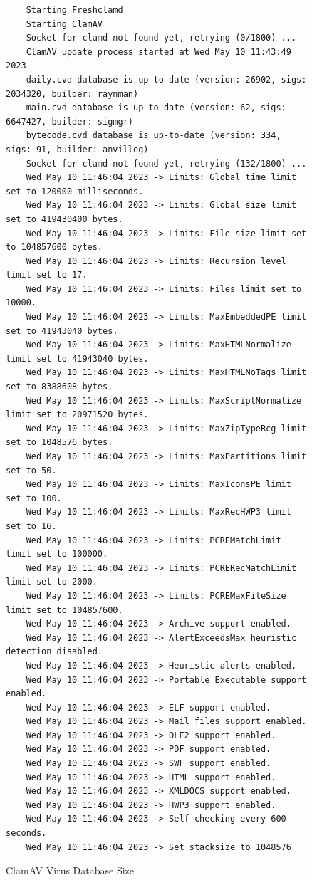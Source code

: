 \documentclass[12pt, conference, final, a4paper, onecolumn, compsoc]{IEEEtran}
\begin{document}
\begin{figure}[H]
  \begin{lstlisting}
    Starting Freshclamd
    Starting ClamAV
    Socket for clamd not found yet, retrying (0/1800) ...
    ClamAV update process started at Wed May 10 11:43:49 2023
    daily.cvd database is up-to-date (version: 26902, sigs: 2034320, builder: raynman)
    main.cvd database is up-to-date (version: 62, sigs: 6647427, builder: sigmgr)
    bytecode.cvd database is up-to-date (version: 334, sigs: 91, builder: anvilleg)
    Socket for clamd not found yet, retrying (132/1800) ...
    Wed May 10 11:46:04 2023 -> Limits: Global time limit set to 120000 milliseconds.
    Wed May 10 11:46:04 2023 -> Limits: Global size limit set to 419430400 bytes.
    Wed May 10 11:46:04 2023 -> Limits: File size limit set to 104857600 bytes.
    Wed May 10 11:46:04 2023 -> Limits: Recursion level limit set to 17.
    Wed May 10 11:46:04 2023 -> Limits: Files limit set to 10000.
    Wed May 10 11:46:04 2023 -> Limits: MaxEmbeddedPE limit set to 41943040 bytes.
    Wed May 10 11:46:04 2023 -> Limits: MaxHTMLNormalize limit set to 41943040 bytes.
    Wed May 10 11:46:04 2023 -> Limits: MaxHTMLNoTags limit set to 8388608 bytes.
    Wed May 10 11:46:04 2023 -> Limits: MaxScriptNormalize limit set to 20971520 bytes.
    Wed May 10 11:46:04 2023 -> Limits: MaxZipTypeRcg limit set to 1048576 bytes.
    Wed May 10 11:46:04 2023 -> Limits: MaxPartitions limit set to 50.
    Wed May 10 11:46:04 2023 -> Limits: MaxIconsPE limit set to 100.
    Wed May 10 11:46:04 2023 -> Limits: MaxRecHWP3 limit set to 16.
    Wed May 10 11:46:04 2023 -> Limits: PCREMatchLimit limit set to 100000.
    Wed May 10 11:46:04 2023 -> Limits: PCRERecMatchLimit limit set to 2000.
    Wed May 10 11:46:04 2023 -> Limits: PCREMaxFileSize limit set to 104857600.
    Wed May 10 11:46:04 2023 -> Archive support enabled.
    Wed May 10 11:46:04 2023 -> AlertExceedsMax heuristic detection disabled.
    Wed May 10 11:46:04 2023 -> Heuristic alerts enabled.
    Wed May 10 11:46:04 2023 -> Portable Executable support enabled.
    Wed May 10 11:46:04 2023 -> ELF support enabled.
    Wed May 10 11:46:04 2023 -> Mail files support enabled.
    Wed May 10 11:46:04 2023 -> OLE2 support enabled.
    Wed May 10 11:46:04 2023 -> PDF support enabled.
    Wed May 10 11:46:04 2023 -> SWF support enabled.
    Wed May 10 11:46:04 2023 -> HTML support enabled.
    Wed May 10 11:46:04 2023 -> XMLDOCS support enabled.
    Wed May 10 11:46:04 2023 -> HWP3 support enabled.
    Wed May 10 11:46:04 2023 -> Self checking every 600 seconds.
    Wed May 10 11:46:04 2023 -> Set stacksize to 1048576
  \end{lstlisting}
    \caption{ClamAV Virus Database Size}
    \label{fig:clamav-db}
\end{figure}
\end{document}

